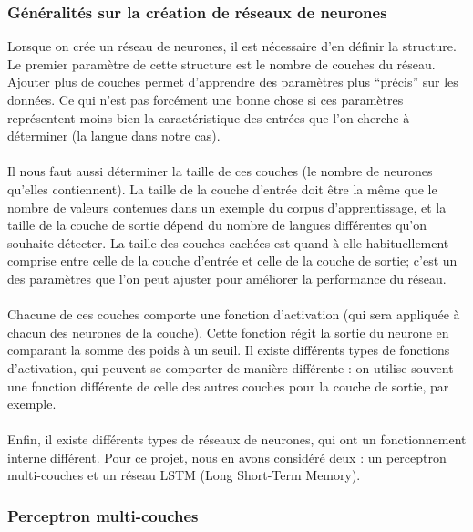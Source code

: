 \documentclass{article}
\begin{document}
\subsubsection{Généralités sur la création de réseaux de neurones}
Lorsque on crée un réseau de neurones, il est nécessaire d'en définir la structure. Le premier paramètre de cette structure est le nombre de couches du réseau. Ajouter plus de couches permet d'apprendre des paramètres plus ``précis'' sur les données. Ce qui n'est pas forcément une bonne chose si ces paramètres représentent moins bien la caractéristique des entrées que l'on cherche à déterminer (la langue dans notre cas).\\
 \\
Il nous faut aussi déterminer la taille de ces couches (le nombre de neurones qu'elles contiennent). La taille de la couche d'entrée doit être la même que le nombre de valeurs contenues dans un exemple du corpus d'apprentissage, et la taille de la couche de sortie dépend du nombre de langues différentes qu'on souhaite détecter. La taille des couches cachées est quand à elle habituellement comprise entre celle de la couche d'entrée et celle de la couche de sortie; c'est un des paramètres que l'on peut ajuster pour améliorer la performance du réseau.\\
 \\
Chacune de ces couches comporte une fonction d'activation (qui sera appliquée à chacun des neurones de la couche). Cette fonction régit la sortie du neurone en comparant la somme des poids à un seuil. Il existe différents types de fonctions d'activation, qui peuvent se comporter de manière différente : on utilise souvent une fonction différente de celle des autres couches pour la couche de sortie, par exemple.\\
 \\
Enfin, il existe différents types de réseaux de neurones, qui ont un fonctionnement interne différent.  Pour ce projet, nous en avons considéré deux : un perceptron multi-couches et un réseau LSTM (Long Short-Term Memory).
 
\subsubsection{Perceptron multi-couches}
\end{document}
